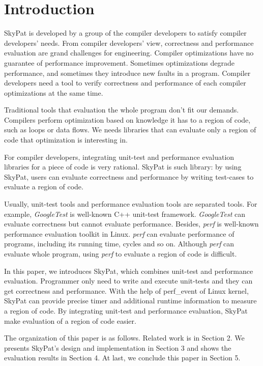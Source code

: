 \documentclass[final]{ols}
\begin{document}
\section{Introduction}
SkyPat is developed by a group of the compiler developers to satisfy compiler developers' needs.
From compiler developers' view, correctness and performance evaluation are grand challenges for engineering.
Compiler optimizations have no guarantee of performance improvement.
Sometimes optimizations degrade performance, and sometimes they introduce new faults in a program.
Compiler developers need a tool to verify correctness and performance of each compiler optimizations at the same time.

Traditional tools that evaluation the whole program don't fit our demands.
Compilers perform optimization based on knowledge it has to a region of code, such as loops or data flows.
We needs libraries that can evaluate only a region of code that optimization is interesting in.

For compiler developers, integrating unit-test and performance evaluation libraries for a piece of code is very rational.
SkyPat is such library: by using SkyPat, users can evaluate correctness and performance by writing test-cases to evaluate a region of code.

Usually, unit-test tools and performance evaluation tools are separated tools.
For example, \textit{GoogleTest} \cite{Google-test} is well-known C++ unit-test framework.
\textit{GoogleTest} can evaluate correctness but cannot evaluate performance.
Besides, \textit{perf} \cite{perf-tools} is well-known performance evaluation toolkit in Linux.
\textit{perf} can evaluate performance of programs, including its running time, cycles and so on.
Although \textit{perf} can evaluate whole program, using \textit{perf} to evaluate a region of code is difficult.

In this paper, we introduces SkyPat, which combines unit-test and performance evaluation.
Programmer only need to write and execute unit-tests and they can get correctness and performance.
With the help of perf\_event of Linux kernel, SkyPat can provide precise timer and additional runtime information to measure a region of code.
By integrating unit-test and performance evaluation, SkyPat make evaluation of a region of code easier.

The organization of this paper is as follows.
Related work is in Section 2.
We presents SkyPat's design and implementation in Section 3 and shows the evaluation results in Section 4.
At last, we conclude this paper in Section 5.
\end{document}
